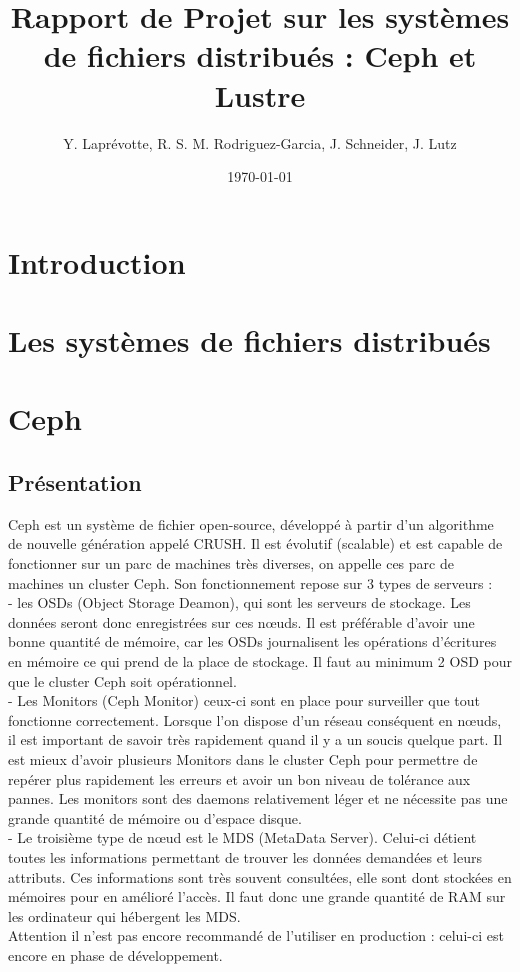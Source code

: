 \documentclass{article}
\title{Rapport de  Projet sur les systèmes de fichiers distribués : Ceph et Lustre}
\author{Y. Laprévotte, R. S. M. Rodriguez-Garcia, J. Schneider, J. Lutz}
\date{\today}
\begin{document}
\pagestyle{fancy}
\lfoot{\today}
 
\maketitle

\newpage
\tableofcontents
\newpage

	\section{Introduction}
	
	\section{Les systèmes de fichiers distribués}
\newpage
	\section{Ceph}
	\subsection{Présentation}
	Ceph est un système de fichier open-source, développé à partir d'un algorithme de nouvelle
génération appelé CRUSH. Il est évolutif (scalable) et est capable de fonctionner sur un parc de machines très diverses, on appelle ces parc de machines un cluster Ceph. Son fonctionnement repose sur 3 types de serveurs :
\\	- les OSDs (Object Storage Deamon), qui sont les serveurs de stockage. Les données seront donc enregistrées sur ces nœuds. Il est préférable d'avoir une bonne quantité de mémoire, car les OSDs journalisent les opérations d'écritures en mémoire ce qui prend de la place de stockage. Il faut au minimum 2 OSD pour que le cluster Ceph soit opérationnel.
\\	- Les Monitors (Ceph Monitor) ceux-ci sont en place pour surveiller que tout fonctionne correctement. Lorsque l'on dispose d'un réseau conséquent en nœuds, il est important de savoir très rapidement quand il y a un soucis quelque part. Il est mieux d'avoir plusieurs Monitors dans le cluster Ceph pour permettre de repérer plus rapidement les erreurs et avoir un bon niveau de tolérance aux pannes. Les monitors sont des daemons relativement léger et ne nécessite pas une grande quantité de mémoire ou d’espace disque.
\\	- Le troisième type de nœud est le MDS (MetaData Server). Celui-ci détient toutes les informations permettant de trouver les données demandées et leurs attributs. Ces informations sont très souvent consultées, elle sont dont stockées en mémoires pour en amélioré l'accès. Il faut donc une grande quantité de RAM sur les ordinateur qui hébergent les MDS.
\\ Attention il n'est pas encore recommandé de l'utiliser en production : celui-ci est encore en phase de développement.
\newpage
\end{document}
